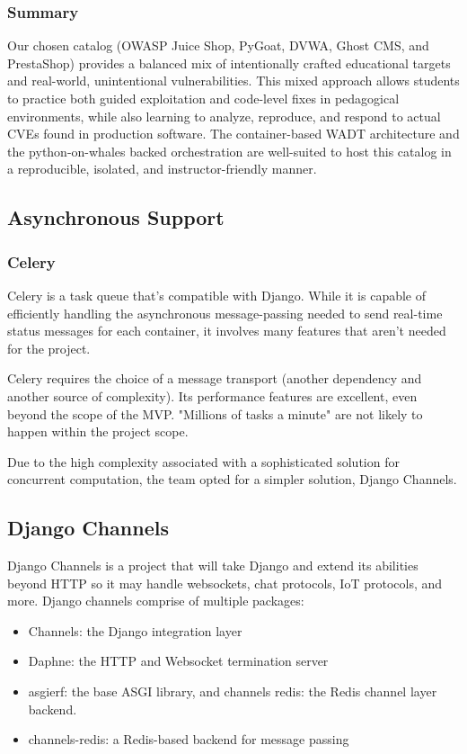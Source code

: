 \documentclass[12pt]{article}
\begin{document}
\subsubsection{Summary}
Our chosen catalog (OWASP Juice Shop, PyGoat, DVWA, Ghost CMS, and PrestaShop) provides a balanced mix of intentionally crafted educational targets and real-world, unintentional vulnerabilities. This mixed approach allows students to practice both guided exploitation and code-level fixes in pedagogical environments, while also learning to analyze, reproduce, and respond to actual CVEs found in production software. The container-based WADT architecture and the python-on-whales backed orchestration are well-suited to host this catalog in a reproducible, isolated, and instructor-friendly manner.

\subsection{Asynchronous Support}

\subsubsection{Celery}
Celery is a task queue that's compatible with Django. While it is capable of efficiently handling the asynchronous message-passing needed to send real-time status messages for each container, it involves many features that aren't needed for the project.

Celery requires the choice of a message transport (another dependency and another source of complexity). Its performance features are excellent, even beyond the scope of the MVP. "Millions of tasks a minute" \cite{celery} are not likely to happen within the project scope.

Due to the high complexity associated with a sophisticated solution for concurrent computation, the team opted for a simpler solution, Django Channels.

\subsection{Django Channels}
Django Channels is a project that will take Django and extend its abilities beyond HTTP so it may handle
websockets, chat protocols, IoT protocols, and more. 
Django channels comprise of multiple packages:
\begin{itemize}
    \item Channels: the Django integration layer
    \item Daphne: the HTTP and Websocket termination server
    \item asgierf: the base ASGI library, and channels redis: the Redis channel layer backend.
    \item channels-redis: a Redis-based backend for message passing
\end{itemize} 
\end{document}
